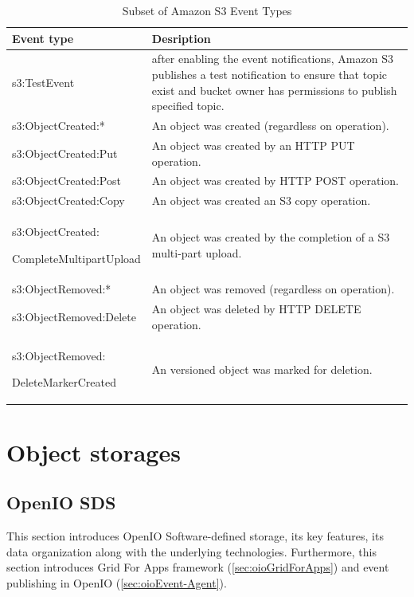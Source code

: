      \renewcommand*{\arraystretch}{1.4}
     \begin{table}[H]
     \begin{tabularx}{\textwidth}{|p{}|X|}
         \hline
         \textbf{Event type} & \textbf{Desription} \\
         \hline
         s3:TestEvent & after enabling the event notifications, Amazon S3 publishes a test notification to ensure that topic exist and bucket owner has permissions to publish specified topic. \\
         \hline
         s3:ObjectCreated:* & An object was created (regardless on operation). \\
         \hline
         s3:ObjectCreated:Put & An object was created by an HTTP PUT operation. \\
         \hline
         s3:ObjectCreated:Post & An object was created by HTTP POST operation. \\
         \hline
         s3:ObjectCreated:Copy & An object was created an S3 copy operation. \\
         \hline
         s3:ObjectCreated:

         CompleteMultipartUpload & An object was created by the completion of a S3 multi-part upload. \\
         \hline
         s3:ObjectRemoved:* & An object was removed (regardless on operation). \\
         \hline
         s3:ObjectRemoved:Delete & An object was deleted by HTTP DELETE operation. \\
         \hline
         s3:ObjectRemoved:

         DeleteMarkerCreated & An versioned object was marked for deletion. \\
         \hline
    \end{tabularx}
    \caption{Subset of Amazon S3 Event Types \cite{eventS3EventNotificationDest}\label{tab:eventTypesS3}}
    \end{table}

\chapter{Object storages}\label{chap:object-storages}
    \section{OpenIO SDS}
    This section introduces OpenIO Software-defined storage, its key features, its data organization along with the underlying technologies. Furthermore, this section introduces Grid For Apps framework (\ref{sec:oioGridForApps}) and event publishing in OpenIO (\ref{sec:oioEvent-Agent}).

